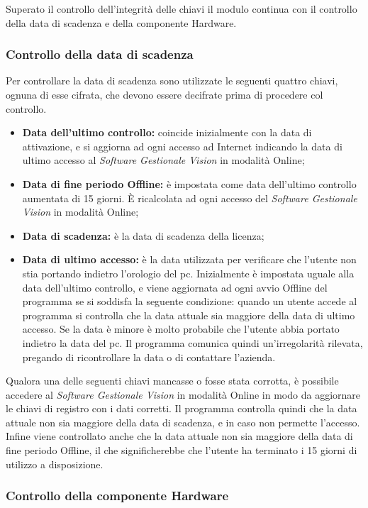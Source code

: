 Superato il controllo dell'integrità delle chiavi il modulo continua con il controllo della data di scadenza e della componente Hardware.

\subsubsection{Controllo della data di scadenza}

Per controllare la data di scadenza sono utilizzate le seguenti quattro chiavi, ognuna di esse cifrata, che devono essere decifrate prima di procedere col controllo. 
\begin{itemize}
\item \textbf{Data dell'ultimo controllo:} coincide inizialmente con la data di attivazione, e si aggiorna ad ogni accesso ad Internet indicando la data di ultimo accesso al \textit{Software Gestionale Vision} in modalità Online;
\item \textbf{Data di fine periodo Offline:} è impostata come data dell'ultimo controllo aumentata di 15 giorni. È ricalcolata ad ogni accesso del \textit{Software Gestionale Vision} in modalità Online;
\item \textbf{Data di scadenza:} è la data di scadenza della licenza;
\item \textbf{Data di ultimo accesso:} è la data utilizzata per verificare che l'utente non stia portando indietro l'orologio del pc. Inizialmente è impostata uguale alla data dell'ultimo controllo, e viene aggiornata ad ogni avvio Offline del programma se si soddisfa la seguente condizione: quando un utente accede al programma si controlla che la data attuale sia  maggiore della data di ultimo accesso. Se la data è minore è molto probabile che l'utente abbia portato indietro la data del pc. Il programma comunica quindi un'irregolarità rilevata, pregando di ricontrollare la data o di contattare l'azienda.
\end{itemize}
Qualora una delle seguenti chiavi mancasse o fosse stata corrotta, è possibile accedere al \textit{Software Gestionale Vision} in modalità Online in modo da aggiornare le chiavi di registro con i dati corretti.
Il programma controlla quindi che la data attuale non sia maggiore della data di scadenza, e in caso non permette l’accesso. Infine viene controllato anche che la data attuale non sia maggiore della data di fine periodo Offline, il che significherebbe che l’utente ha terminato i 15 giorni di utilizzo a disposizione.

\subsubsection{Controllo della componente Hardware}

